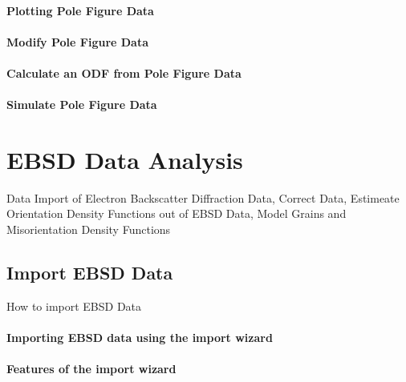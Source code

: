 \documentclass{article}
\begin{document}
			\paragraph{Plotting Pole Figure Data}
		
			\paragraph{Modify Pole Figure Data}
		
			\paragraph{Calculate an ODF from Pole Figure Data}
		
			\paragraph{Simulate Pole Figure Data}
		
		\section{EBSD Data Analysis}

		
                  \begin{par}
Data Import of Electron Backscatter Diffraction Data, Correct Data, Estimeate Orientation Density Functions out of EBSD Data, Model Grains and Misorientation Density Functions
\end{par} \vspace{1em}

               
		\subsection{Import EBSD Data}

		
                     \begin{par}
How to import EBSD Data
\end{par} \vspace{1em}

                  
			\paragraph{Importing EBSD data using the import wizard}
		
			\paragraph{Features of the import wizard}
		
\end{document}
